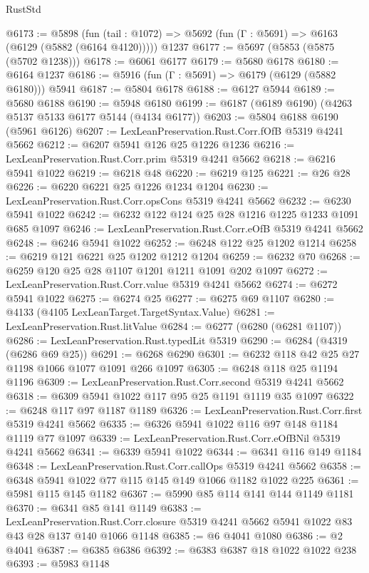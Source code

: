 \begin{lexlean}{RustStd}
\begin{coremodule}
@6173 := @5898
    (fun (tail : @1072) => @5692 (fun (Γ : @5691) => @6163 (@6129 (@5882 (@6164 @4120)))))
    @1237
@6177 := @5697 (@5853 (@5875 (@5702 @1238)))
@6178 := @6061 @6177
@6179 := @5680 @6178
@6180 := @6164 @1237
@6186 := @5916 (fun (Γ : @5691) => @6179 (@6129 (@5882 @6180))) @5941
@6187 := @5804 @6178
@6188 := @6127 @5944
@6189 := @5680 @6188
@6190 := @5948 @6180
@6199 := @6187 (@6189 @6190) (@4263 @5137 @5133 @6177 @5144 (@4134 @6177))
@6203 := @5804 @6188 @6190 (@5961 @6126)
@6207 := LexLeanPreservation.Rust.Corr.fOfB @5319 @4241 @5662
@6212 := @6207 @5941 @126 @25 @1226 @1236
@6216 := LexLeanPreservation.Rust.Corr.prim @5319 @4241 @5662
@6218 := @6216 @5941 @1022
@6219 := @6218 @48
@6220 := @6219 @125
@6221 := @26 @28
@6226 := @6220 @6221 @25 @1226 @1234 @1204
@6230 := LexLeanPreservation.Rust.Corr.opsCons @5319 @4241 @5662
@6232 := @6230 @5941 @1022
@6242 := @6232 @122 @124 @25 @28 @1216 @1225 @1233 @1091 @685 @1097
@6246 := LexLeanPreservation.Rust.Corr.eOfB @5319 @4241 @5662
@6248 := @6246 @5941 @1022
@6252 := @6248 @122 @25 @1202 @1214
@6258 := @6219 @121 @6221 @25 @1202 @1212 @1204
@6259 := @6232 @70
@6268 := @6259 @120 @25 @28 @1107 @1201 @1211 @1091 @202 @1097
@6272 := LexLeanPreservation.Rust.Corr.value @5319 @4241 @5662
@6274 := @6272 @5941 @1022
@6275 := @6274 @25
@6277 := @6275 @69 @1107
@6280 := @4133 (@4105 LexLeanTarget.TargetSyntax.Value)
@6281 := LexLeanPreservation.Rust.litValue
@6284 := @6277 (@6280 (@6281 @1107))
@6286 := LexLeanPreservation.Rust.typedLit @5319
@6290 := @6284 (@4319 (@6286 @69 @25))
@6291 := @6268 @6290
@6301 := @6232 @118 @42 @25 @27 @1198 @1066 @1077 @1091 @266 @1097
@6305 := @6248 @118 @25 @1194 @1196
@6309 := LexLeanPreservation.Rust.Corr.second @5319 @4241 @5662
@6318 := @6309 @5941 @1022 @117 @95 @25 @1191 @1119 @35 @1097
@6322 := @6248 @117 @97 @1187 @1189
@6326 := LexLeanPreservation.Rust.Corr.first @5319 @4241 @5662
@6335 := @6326 @5941 @1022 @116 @97 @148 @1184 @1119 @77 @1097
@6339 := LexLeanPreservation.Rust.Corr.eOfBNil @5319 @4241 @5662
@6341 := @6339 @5941 @1022
@6344 := @6341 @116 @149 @1184
@6348 := LexLeanPreservation.Rust.Corr.callOps @5319 @4241 @5662
@6358 := @6348 @5941 @1022 @77 @115 @145 @149 @1066 @1182 @1022 @225
@6361 := @5981 @115 @145 @1182
@6367 := @5990 @85 @114 @141 @144 @1149 @1181
@6370 := @6341 @85 @141 @1149
@6383 := LexLeanPreservation.Rust.Corr.closure
    @5319
    @4241
    @5662
    @5941
    @1022
    @83
    @43
    @28
    @137
    @140
    @1066
    @1148
@6385 := @6 @4041 @1080
@6386 := @2 @4041
@6387 := @6385 @6386
@6392 := @6383 @6387 @18 @1022 @1022 @238
@6393 := @5983 @1148

\end{coremodule}
\end{lexlean}
